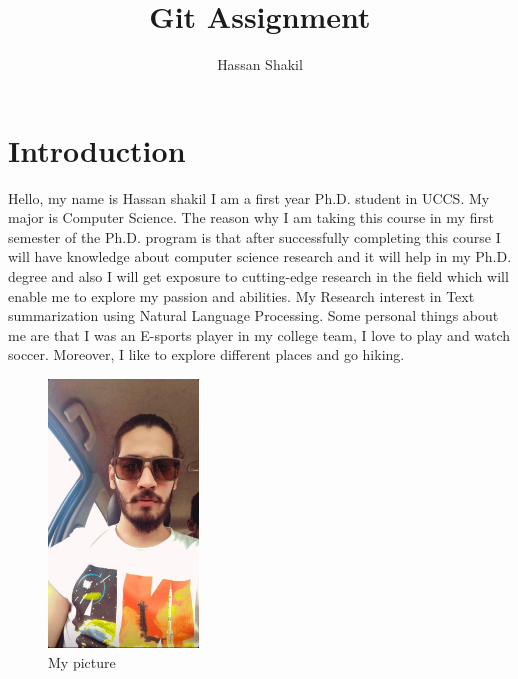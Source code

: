 




\title{Git Assignment}
\author{Hassan Shakil}

\maketitle


\section{Introduction}

Hello, my name is Hassan shakil I am a first year Ph.D. student in UCCS. My major is Computer Science. The reason why I am taking this course in my first semester of the Ph.D. program is that after successfully completing this course I will have knowledge about computer science research and it will help in my Ph.D. degree and also I will get exposure to cutting-edge research in the field which will enable me to explore my passion and abilities. My Research interest in Text summarization using Natural Language Processing. Some personal things about me are that I was an E-sports player in my college team, I love to play and watch soccer. Moreover, I like to explore different places and go hiking.

\begin{figure}[htp]
    \centering
    \includegraphics[width=4cm]{Myimg.jpeg}
    \caption{My picture}
    \label{fig:Myimg}
\end{figure}

